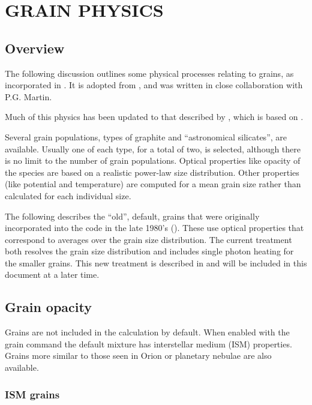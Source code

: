 \chapter{GRAIN PHYSICS}

\section{Overview}

The following discussion outlines some physical processes relating to
grains, as incorporated in \Cloudy.  It is adopted from \citet{Baldwin1991},
and was written in close collaboration with P.G. Martin.

Much of this physics has been updated to that described by \citet{VanHoof2004}, which is based on \citep{Weingartner2001a}.

Several grain populations, types of graphite and ``astronomical
silicates'', are available.  Usually one of each type, for a total of two,
is selected, although there is no limit to the number of grain populations.
Optical properties like opacity of the species are based on a realistic
power-law size distribution.  Other properties (like potential and
temperature) are computed for a mean grain size rather than calculated for
each individual size.

 The following describes the ``old'', default, grains that were originally
incorporated into the code in the late 1980's (\citealp{Baldwin1991}).  These
use optical properties that correspond to averages over the grain size
distribution.  The current treatment both resolves the grain
size distribution and includes single photon heating for the smaller grains.
This new treatment is described in \citet{VanHoof2001} and will be
included in this document at a later time.

\section{Grain opacity}

Grains are not included in the calculation by default.  When enabled
with the grain command the default mixture has interstellar medium (ISM)
properties.  Grains more similar to those seen in Orion or planetary nebulae
are also available.

\subsection{ISM grains}

